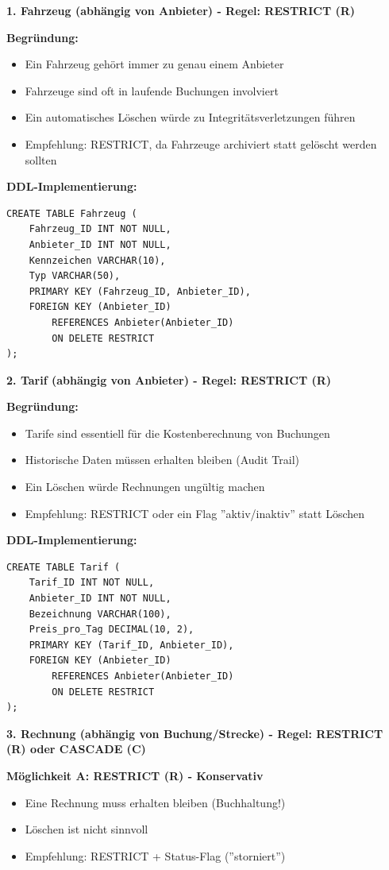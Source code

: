 \documentclass[12pt,a4paper]{article}
\begin{document}
\textbf{1. Fahrzeug (abhängig von Anbieter) - Regel: RESTRICT (R)}

\textbf{Begründung:}
\begin{itemize}
    \item Ein Fahrzeug gehört immer zu genau einem Anbieter
    \item Fahrzeuge sind oft in laufende Buchungen involviert
    \item Ein automatisches Löschen würde zu Integritätsverletzungen führen
    \item Empfehlung: RESTRICT, da Fahrzeuge archiviert statt gelöscht werden sollten
\end{itemize}

\textbf{DDL-Implementierung:}
\begin{verbatim}
CREATE TABLE Fahrzeug (
    Fahrzeug_ID INT NOT NULL,
    Anbieter_ID INT NOT NULL,
    Kennzeichen VARCHAR(10),
    Typ VARCHAR(50),
    PRIMARY KEY (Fahrzeug_ID, Anbieter_ID),
    FOREIGN KEY (Anbieter_ID) 
        REFERENCES Anbieter(Anbieter_ID)
        ON DELETE RESTRICT
);
\end{verbatim}

\textbf{2. Tarif (abhängig von Anbieter) - Regel: RESTRICT (R)}

\textbf{Begründung:}
\begin{itemize}
    \item Tarife sind essentiell für die Kostenberechnung von Buchungen
    \item Historische Daten müssen erhalten bleiben (Audit Trail)
    \item Ein Löschen würde Rechnungen ungültig machen
    \item Empfehlung: RESTRICT oder ein Flag ''aktiv/inaktiv'' statt Löschen
\end{itemize}

\textbf{DDL-Implementierung:}
\begin{verbatim}
CREATE TABLE Tarif (
    Tarif_ID INT NOT NULL,
    Anbieter_ID INT NOT NULL,
    Bezeichnung VARCHAR(100),
    Preis_pro_Tag DECIMAL(10, 2),
    PRIMARY KEY (Tarif_ID, Anbieter_ID),
    FOREIGN KEY (Anbieter_ID) 
        REFERENCES Anbieter(Anbieter_ID)
        ON DELETE RESTRICT
);
\end{verbatim}

\textbf{3. Rechnung (abhängig von Buchung/Strecke) - Regel: RESTRICT (R) oder CASCADE (C)}

\textbf{Möglichkeit A: RESTRICT (R) - Konservativ}
\begin{itemize}
    \item Eine Rechnung muss erhalten bleiben (Buchhaltung!)
    \item Löschen ist nicht sinnvoll
    \item Empfehlung: RESTRICT + Status-Flag (''storniert'')
\end{itemize}
\end{document}
